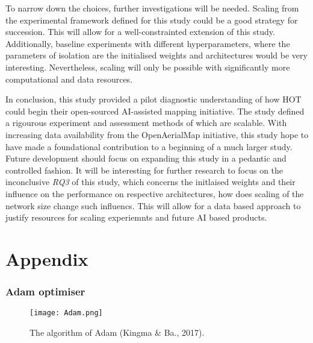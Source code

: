 \documentclass[11pt, a4paper, twoside]{report}
\begin{document}
To narrow down the choices, further investigations will be needed. Scaling from the experimental framework defined for this study could be a good strategy for succession. This will allow for a well-constrainted extension of this study. Additionally, baseline experiments with different hyperparameters, where the parameters of isolation are the initialised weights and architectures would  be very interesting. Nevertheless, scaling will only be possible with significantly more computational and data resources.\\\par

In conclusion, this study provided a pilot diagnostic understanding of how HOT could begin their open-sourced AI-assisted mapping initiative. The study defined a rigourous experiment and assessment methods of which are scalable. With increasing data availability from the OpenAerialMap initiative, this study hope to have made a foundational contribution to a beginning of a much larger study. Future development should focus on expanding this study in a pedantic and controlled fashion. It will be interesting for further research to focus on the inconclusive \textit{RQ3} of this study, which concerns the initlaised weights and their influence on the performance on respective architectures, how does scaling of the network size change such influencs. This will allow for a data based approach to justify resources for scaling experiemnts and future AI based products.\\\par

\newpage

\printbibliography[
  heading=bibintoc,
  title={Bibliography}
]

\newpage

\chapter{Appendix}\label{Appen}

\subsection{Adam optimiser}\label{Adam}

\begin{figure}[H]
  \centering
  \texttt{[image: Adam.png]}
  \caption{The algorithm of Adam (Kingma \& Ba., 2017).}
  \label{app:Adam}
\end{figure}
\end{document}
